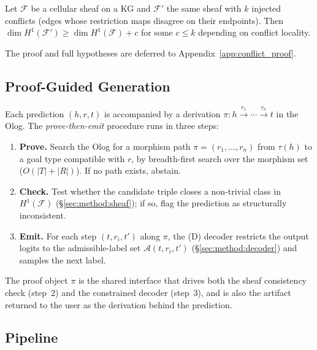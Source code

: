 \begin{theorem}
\label{thm:conflict_sensitivity}
Let $\mathcal{F}$ be a cellular sheaf on a KG and $\mathcal{F}'$ the same
sheaf with $k$ injected conflicts (edges whose restriction maps disagree
on their endpoints). Then $\dim H^1(\mathcal{F}') \geq \dim
H^1(\mathcal{F}) + c$ for some $c \leq k$ depending on conflict
locality.
\end{theorem}
The proof and full hypotheses are deferred to
Appendix~\ref{app:conflict_proof}.

\subsection{Proof-Guided Generation}
\label{sec:method:proof}
Each prediction $(h, r, t)$ is accompanied by a derivation
$\pi: h \xrightarrow{r_1} \cdots \xrightarrow{r_n} t$ in the Olog. The
\emph{prove-then-emit} procedure runs in three steps:
\begin{enumerate}
\item \textbf{Prove.} Search the Olog for a morphism path
$\pi = (r_1, \ldots, r_n)$ from $\tau(h)$ to a goal type compatible
with $r$, by breadth-first search over the morphism set
($O(|T| + |R|)$). If no path exists, abstain.
\item \textbf{Check.} Test whether the candidate triple closes a
non-trivial class in $H^1(\mathcal{F})$ (\S\ref{sec:method:sheaf}); if
so, flag the prediction as structurally inconsistent.
\item \textbf{Emit.} For each step $(t, r_i, t')$ along $\pi$, the (D)
decoder restricts the output logits to the admissible-label set
$\mathcal{A}(t, r_i, t')$ (\S\ref{sec:method:decoder}) and samples the
next label.
\end{enumerate}
The proof object $\pi$ is the shared interface that drives both the
sheaf consistency check (step~2) and the constrained decoder (step~3),
and is also the artifact returned to the user as the derivation behind
the prediction.

\subsection{Pipeline}
\label{sec:method:pipeline}

